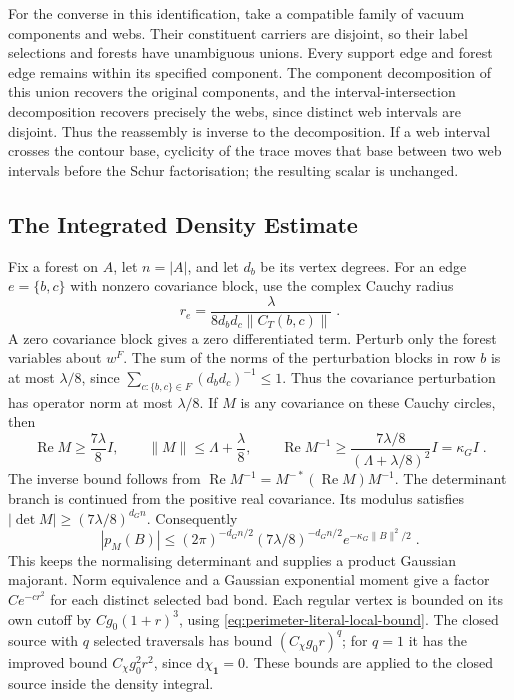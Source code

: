 \documentclass[11pt]{article}
\newcommand{\dd}{\mathrm{d}}
\newcommand{\id}{\mathbf 1}
\begin{document}
For the converse in this identification, take a compatible family of vacuum components and webs. Their constituent carriers are disjoint, so their label selections and forests have unambiguous unions. Every support edge and forest edge remains within its specified component. The component decomposition of this union recovers the original components, and the interval-intersection decomposition recovers precisely the webs, since distinct web intervals are disjoint. Thus the reassembly is inverse to the decomposition. If a web interval crosses the contour base, cyclicity of the trace moves that base between two web intervals before the Schur factorisation; the resulting scalar is unchanged.

\subsection{The Integrated Density Estimate}

Fix a forest on $A$, let $n=|A|$, and let $d_b$ be its vertex degrees. For an edge $e=\{b,c\}$ with nonzero covariance block, use the complex Cauchy radius
\begin{equation}\label{eq:marginal-edge-radius}
    r_e=\frac{\lambda}{8d_bd_c\|C_T(b,c)\|}\;.
\end{equation}
A zero covariance block gives a zero differentiated term. Perturb only the forest variables about $w^F$. The sum of the norms of the perturbation blocks in row $b$ is at most $\lambda/8$, since $\sum_{c:\{b,c\}\in F}(d_bd_c)^{-1}\leq 1$. Thus the covariance perturbation has operator norm at most $\lambda/8$. If $M$ is any covariance on these Cauchy circles, then
\begin{equation}\label{eq:marginal-complex-density}
    \operatorname{Re}M\geq \frac{7\lambda}{8}I,
    \qquad \|M\|\leq \Lambda+\frac{\lambda}{8},
    \qquad
    \operatorname{Re}M^{-1}\geq
        \frac{7\lambda/8}{(\Lambda+\lambda/8)^2}I=\kappa_G I\;.
\end{equation}
The inverse bound follows from $\operatorname{Re}M^{-1}=M^{-*}(\operatorname{Re}M)M^{-1}$. The determinant branch is continued from the positive real covariance. Its modulus satisfies $|\det M|\geq (7\lambda/8)^{d_G n}$. Consequently
\begin{equation}\label{eq:marginal-density-majorant}
    |p_M(B)|\leq
        (2\pi)^{-d_Gn/2}(7\lambda/8)^{-d_Gn/2}
            e^{-\kappa_G\|B\|^2/2}\;.
\end{equation}
This keeps the normalising determinant and supplies a product Gaussian majorant. Norm equivalence and a Gaussian exponential moment give a factor $C e^{-c r^2}$ for each distinct selected bad bond. Each regular vertex is bounded on its own cutoff by $C g_0(1+r)^3$, using \eqref{eq:perimeter-literal-local-bound}. The closed source with $q$ selected traversals has bound $(C_\chi g_0r)^q$; for $q=1$ it has the improved bound $C_\chi g_0^2r^2$, since $\dd\chi_{\id}=0$. These bounds are applied to the closed source inside the density integral.
\end{document}
